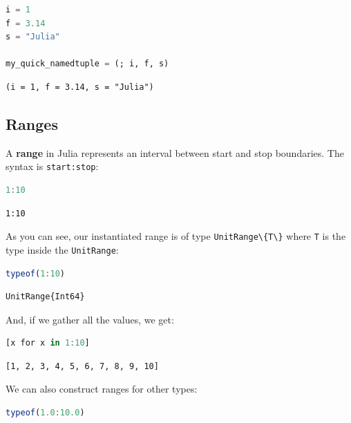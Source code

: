\documentclass[
  notoc %
]{tufte-book}
\newcommand{\passthrough}[1]{#1}
\begin{document}
\begin{lstlisting}[language=Julia]
i = 1
f = 3.14
s = "Julia"

my_quick_namedtuple = (; i, f, s)
\end{lstlisting}

\begin{lstlisting}[language=Output]
(i = 1, f = 3.14, s = "Julia")
\end{lstlisting}

\hypertarget{sec:ranges}{%
\subsection{Ranges}\label{sec:ranges}}

A \textbf{range} in Julia represents an interval between start and stop
boundaries. The syntax is \passthrough{\lstinline!start:stop!}:

\begin{lstlisting}[language=Julia]
1:10
\end{lstlisting}

\begin{lstlisting}[language=Output]
1:10
\end{lstlisting}

As you can see, our instantiated range is of type
\passthrough{\lstinline!UnitRange\{T\}!} where
\passthrough{\lstinline!T!} is the type inside the
\passthrough{\lstinline!UnitRange!}:

\begin{lstlisting}[language=Julia]
typeof(1:10)
\end{lstlisting}

\begin{lstlisting}[language=Output]
UnitRange{Int64}
\end{lstlisting}

And, if we gather all the values, we get:

\begin{lstlisting}[language=Julia]
[x for x in 1:10]
\end{lstlisting}

\begin{lstlisting}[language=Output]
[1, 2, 3, 4, 5, 6, 7, 8, 9, 10]
\end{lstlisting}

We can also construct ranges for other types:

\begin{lstlisting}[language=Julia]
typeof(1.0:10.0)
\end{lstlisting}
\end{document}
